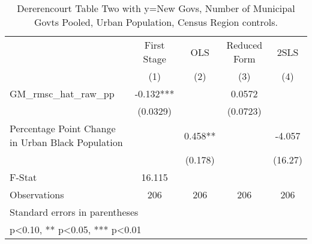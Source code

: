 \begin{table}[htbp]\centering
\def\sym#1{\ifmmode^{#1}\else\(^{#1}\)\fi}
\caption{Dererencourt Table Two with y=New Govs, Number of Municipal Govts  Pooled, Urban Population, Census Region controls.}
\begin{tabular}{l*{4}{c}}
\toprule
                    & First Stage   &         OLS   &Reduced Form   &        2SLS   \\
                    &\multicolumn{1}{c}{(1)}   &\multicolumn{1}{c}{(2)}   &\multicolumn{1}{c}{(3)}   &\multicolumn{1}{c}{(4)}   \\
\midrule
GM\_rmsc\_hat\_raw\_pp  &      -0.132***&               &      0.0572   &               \\
                    &    (0.0329)   &               &    (0.0723)   &               \\
\addlinespace
Percentage Point Change in Urban Black Population&               &       0.458** &               &      -4.057   \\
                    &               &     (0.178)   &               &     (16.27)   \\
\midrule
F-Stat              &      16.115   &               &               &               \\
Observations        &         206   &         206   &         206   &         206   \\
\bottomrule
\multicolumn{5}{l}{\footnotesize Standard errors in parentheses}\\
\multicolumn{5}{l}{\footnotesize * p<0.10, ** p<0.05, *** p<0.01}\\
\end{tabular}
\end{table}
